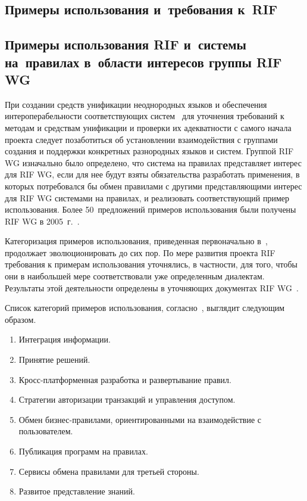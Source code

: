 \begin{multicols}{2}
\section{Примеры использования и~требования к~RIF}
   
   \subsection{Примеры использования RIF и~системы на~правилах в~области интересов группы RIF 
WG} %

При создании средств унификации неоднородных языков и обеспечения 
интероперабельности соответствующих систем~\cite{38kal} для уточнения требований к 
методам и средствам унификации и проверки их адекватности с самого начала проекта 
следует позаботиться об установлении взаимодействия с группами создания и поддержки 
конкретных разнородных языков и систем. Группой RIF WG изначально было определено, 
что система на правилах представляет интерес для RIF WG, если для нее будут взяты 
обязательства разработать применения, в которых потребовался бы обмен правилами с 
другими представляющими интерес для RIF WG сис\-те\-ма\-ми на правилах, и реализовать 
со\-от\-вет\-ст\-ву\-ющий пример использования. Более 50~предложений примеров использования 
были получены RIF WG в 2005~г.~\cite{39kal}. 

Категоризация примеров использования, приведенная первоначально в~\cite{40kal}, 
продолжает эволюционировать до сих пор. По мере развития проекта RIF требования к 
примерам использования уточнялись, в частности, для того, чтобы они в наибольшей мере 
соответствовали уже определенным диалектам. Результаты этой деятельности определены 
в уточняющих документах RIF WG~\cite{41kal}.

Список категорий примеров использования, согласно~\cite{40kal}, выглядит следующим 
образом.
\begin{enumerate}[1.]
\item Интеграция информации.
\item Принятие решений.
\item Кросс-платформенная разработка и развертывание правил.
\item Стратегии авторизации транзакций и управления доступом.
\item Обмен бизнес-правилами, ориентированными на взаимодействие с пользователем.
\item Публикация программ на правилах.
\item Сервисы обмена правилами для третьей сто\-роны.
\item Развитое представление знаний.
\end{enumerate}


\end{multicols}
